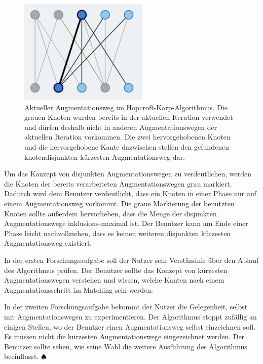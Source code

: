 \begin{figure}[h!]
	\centering
	\includegraphics[width=0.55\textwidth]{figures/hopcroft_karp_augmentation}
	\caption[Hopcroft-Karp: Augmentationsweg]{Aktueller Augmentationsweg im Hopcroft-Karp-Algorithmus. Die grauen Knoten wurden bereits in der aktuellen Iteration verwendet und dürfen deshalb nicht in anderen Augmentationswegen der aktuellen Iteration vorkommen. Die zwei hervorgehobenen Knoten und die hervorgehobene Kante dazwischen stellen den gefundenen knotendisjunkten kürzesten Augmentationsweg dar.}\label{fig:hopcroft_karp_augmentation}
\end{figure}

Um das Konzept von disjunkten Augmentationswegen zu verdeutlichen, werden die Knoten der bereits verarbeiteten Augmentationswegen grau markiert. Dadurch wird dem Benutzer verdeutlicht, dass ein Knoten in einer Phase nur auf einem Augmentationsweg vorkommt. 
Die graue Markierung der benutzten Knoten sollte außerdem hervorheben, dass die Menge der disjunkten Augmentationswege inklusions-maximal ist. Der Benutzer kann am Ende einer Phase leicht nachvollziehen, dass es keinen weiteren disjunkten kürzesten Augmentationsweg existiert.

In der ersten Forschungsaufgabe soll der Nutzer sein Verständnis über den Ablauf des Algorithmus prüfen. Der Benutzer sollte das Konzept von kürzesten Augmentationswegen verstehen und wissen, welche Kanten nach einem Augmentationsschritt im Matching sein werden.

In der zweiten Forschungsaufgabe bekommt der Nutzer die Gelegenheit, selbst mit Augmentationswegen zu experimentieren. Der Algorithmus stoppt zufällig an einigen Stellen, wo der Benutzer einen Augmentationsweg selbst einzeichnen soll. Es müssen nicht die kürzesten Augmentationswege eingezeichnet werden. Der Benutzer sollte sehen, wie seine Wahl die weitere Ausführung des Algorithmus beeinflusst. \hfill$\spadesuit$

